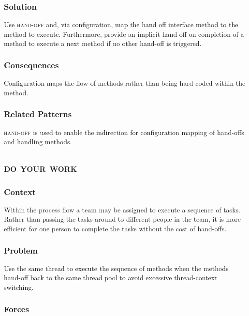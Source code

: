 \documentclass[prodmode]{style/acmlarge}
\begin{document}
\subsubsection*{Solution}

Use \textsc{hand-off} and, via configuration, map the hand off interface method
to the method to execute.  Furthermore, provide an implicit hand off on
completion of a method to execute a next method if no other hand-off is
triggered.

\subsubsection*{Consequences}

Configuration maps the flow of methods rather than being hard-coded within the
method.

\subsubsection*{Related Patterns}

\textsc{hand-off} is used to enable the indirection for configuration mapping of
hand-offs and handling methods.


\subsection{\textsc{\textbf{do your work}}}

\subsubsection*{Context}

Within the process flow a team may be assigned to execute a sequence of tasks. 
Rather than passing the tasks around to different people in the team, it is more
efficient for one person to complete the tasks without the cost of hand-offs.

\subsubsection*{Problem}

Use the same thread to execute the sequence of methods when the methods hand-off
back to the same thread pool to avoid excessive thread-context switching.

\subsubsection*{Forces}
\end{document}
